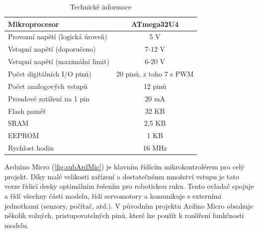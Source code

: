 \documentclass[thesis=B,czech]{FITthesis}[2012/06/26]
\begin{document}
\begin{table}[!htbp]\centering
\caption{Technické informace}
\label{tab:ArdMicr}
\begin{tabular}{|l|c|}
 \hline
Mikroprocesor & ATmega32U4  \\ \hline
Provozní napětí (logická úroveň) & 5 V  \\ \hline
Vstupní napětí (doporučeno) & 7-12 V \\ \hline
Vstupní napětí (maximální limit) & 6-20 V \\ \hline
Počet digitálních I/O pinů) & 20 pinů, z toho 7 s PWM \\ \hline
Počet analogových vstupů & 12 pinů \\ \hline
Proudové zatížení na 1 pin & 20 mA \\ \hline
Flash paměť & 32 KB \\ \hline
SRAM & 2,5 KB \\ \hline
EEPROM & 1 KB\\ \hline
Rychlost hodin & 16 MHz \\ \hline
\end{tabular}
\end{table}



Arduino Micro (\ref{fig:subArdMic}) je hlavním řídícím mikrokontrolérem  pro celý projekt. Díky malé velikosti zařízení a dostatečnému množství vstupu je tato verze řídicí desky optimálním řešením pro robotickou ruku. Tento ovladač spojuje a řídí všechny části modelu, řídí servomotory a komunikuje s externími jednotkami (senzory, počítač, atd.). V původním projektu Ardino Micro obsahuje několik volných, pristupovatelných pinů, které lze použít k rozšíření funkčnosti modelu.
\end{document}
